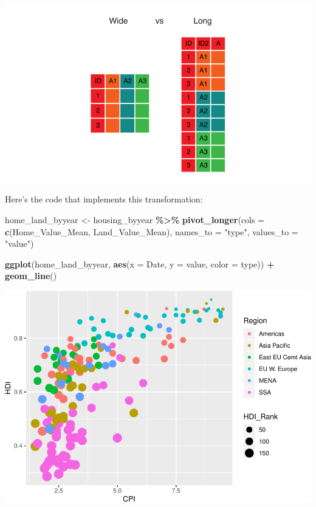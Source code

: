 \documentclass[
]{book}
\newenvironment{Shaded}{\begin{snugshade}}{\end{snugshade}}
\newcommand{\DataTypeTok}[1]{\textcolor[rgb]{0.13,0.29,0.53}{#1}}
\newcommand{\KeywordTok}[1]{\textcolor[rgb]{0.13,0.29,0.53}{\textbf{#1}}}
\newcommand{\NormalTok}[1]{#1}
\newcommand{\OperatorTok}[1]{\textcolor[rgb]{0.81,0.36,0.00}{\textbf{#1}}}
\newcommand{\StringTok}[1]{\textcolor[rgb]{0.31,0.60,0.02}{#1}}
\begin{document}
\includegraphics{R/Rgraphics/images/wide_vs_long.png}

Here's the code that implements this transformation:

\begin{Shaded}
\begin{Highlighting}[]
\NormalTok{home\_land\_byyear \textless{}{-}}\StringTok{ }
\StringTok{    }\NormalTok{housing\_byyear }\OperatorTok{\%\textgreater{}\%}
\StringTok{    }\KeywordTok{pivot\_longer}\NormalTok{(}\DataTypeTok{cols =} \KeywordTok{c}\NormalTok{(Home\_Value\_Mean, Land\_Value\_Mean),}
                 \DataTypeTok{names\_to =} \StringTok{"type"}\NormalTok{,}
                 \DataTypeTok{values\_to =} \StringTok{"value"}\NormalTok{)}
                          
\KeywordTok{ggplot}\NormalTok{(home\_land\_byyear, }\KeywordTok{aes}\NormalTok{(}\DataTypeTok{x =}\NormalTok{ Date, }\DataTypeTok{y =}\NormalTok{ value, }\DataTypeTok{color =}\NormalTok{ type)) }\OperatorTok{+}
\StringTok{  }\KeywordTok{geom\_line}\NormalTok{()}
\end{Highlighting}
\end{Shaded}

\includegraphics{R/Rgraphics/figures/unnamed-chunk-201-1.pdf}
\end{document}
